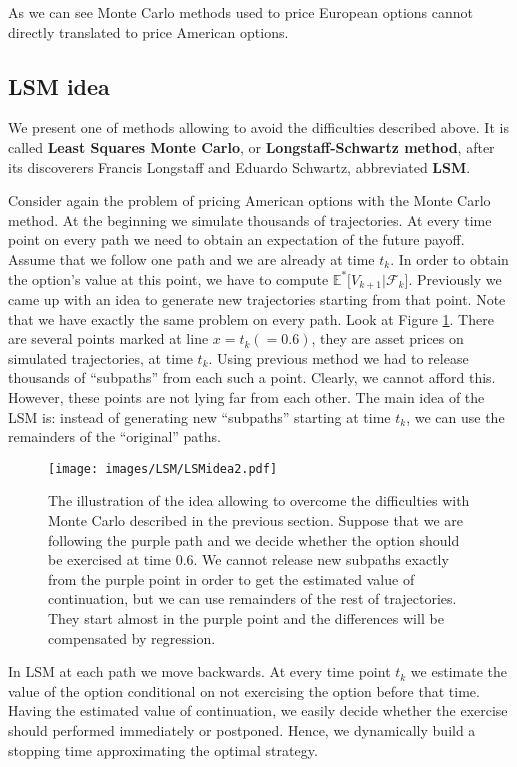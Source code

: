 \documentclass[a4paper,11pt, twoside]{book}
\theoremstyle{definition}
\theoremstyle{remark}
\def\Em{{\mathbb{E}^*}}
\begin{document}
As we can see Monte Carlo methods used to price European options cannot directly translated to price American options.
\newpage
\subsection{LSM idea}
\label{subsec:LSMidea}

We present one of methods allowing to avoid the difficulties described above. It is called \textbf{Least Squares Monte Carlo}, or \textbf{Longstaff-Schwartz method}, after its discoverers Francis Longstaff and Eduardo Schwartz, abbreviated \textbf{LSM}.

Consider again the problem of pricing American options with the Monte Carlo method. At the beginning we simulate thousands of trajectories. At every time point on every path we need to obtain an expectation of the future payoff. Assume that we follow one path and we are already at time $t_k$. In order to obtain the option's value at this point, we have to compute $\Em\bigl[ V_{k+1} | \mathcal{F}_{k} \bigr]$. Previously we came up with an idea to generate new trajectories starting from that point.
Note that we have exactly the same problem on every path. Look at Figure \ref{fig:LSMidea}. There are several points marked at line $x = t_k (= 0.6)$, they are asset prices on simulated trajectories, at time $t_k$. Using previous method we had to release thousands of ``subpaths'' from each such a point. Clearly, we cannot afford this. However, these points are not lying far from each other. The main idea of the LSM is: instead of generating new ``subpaths'' starting at time $t_k$, we can use the remainders of the ``original'' paths.
\begin{figure}
\centering
 \texttt{[image: images/LSM/LSMidea2.pdf]}
\caption{The illustration of the idea allowing to overcome the difficulties with Monte Carlo described in the previous section. Suppose that we are following the purple path and we decide whether the option should be exercised at time $0.6$. We cannot release new subpaths exactly from the purple point in order to get the estimated value of continuation, but we can use remainders of the rest of trajectories. They start almost in the purple point and the differences will be compensated by regression.}
\label{fig:LSMidea}
\end{figure}

In LSM at each path we move backwards. At every time point $t_k$ we estimate the value of the option conditional on not exercising the option before that time. Having the estimated value of continuation, we easily decide whether the exercise should performed immediately or postponed. Hence, we dynamically build a stopping time approximating the optimal strategy.
\end{document}
